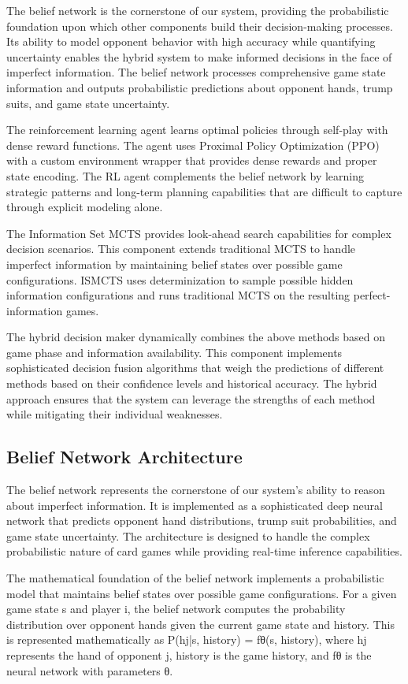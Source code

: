 \documentclass[conference]{IEEEtran}
\begin{document}
The belief network is the cornerstone of our system, providing the probabilistic foundation upon which other components build their decision-making processes. Its ability to model opponent behavior with high accuracy while quantifying uncertainty enables the hybrid system to make informed decisions in the face of imperfect information. The belief network processes comprehensive game state information and outputs probabilistic predictions about opponent hands, trump suits, and game state uncertainty.

The reinforcement learning agent learns optimal policies through self-play with dense reward functions. The agent uses Proximal Policy Optimization (PPO) with a custom environment wrapper that provides dense rewards and proper state encoding. The RL agent complements the belief network by learning strategic patterns and long-term planning capabilities that are difficult to capture through explicit modeling alone.

The Information Set MCTS provides look-ahead search capabilities for complex decision scenarios. This component extends traditional MCTS to handle imperfect information by maintaining belief states over possible game configurations. ISMCTS uses determinization to sample possible hidden information configurations and runs traditional MCTS on the resulting perfect-information games.

The hybrid decision maker dynamically combines the above methods based on game phase and information availability. This component implements sophisticated decision fusion algorithms that weigh the predictions of different methods based on their confidence levels and historical accuracy. The hybrid approach ensures that the system can leverage the strengths of each method while mitigating their individual weaknesses.

\subsection{Belief Network Architecture}

The belief network represents the cornerstone of our system's ability to reason about imperfect information. It is implemented as a sophisticated deep neural network that predicts opponent hand distributions, trump suit probabilities, and game state uncertainty. The architecture is designed to handle the complex probabilistic nature of card games while providing real-time inference capabilities.

The mathematical foundation of the belief network implements a probabilistic model that maintains belief states over possible game configurations. For a given game state s and player i, the belief network computes the probability distribution over opponent hands given the current game state and history. This is represented mathematically as P(hj|s, history) = fθ(s, history), where hj represents the hand of opponent j, history is the game history, and fθ is the neural network with parameters θ.
\end{document}
